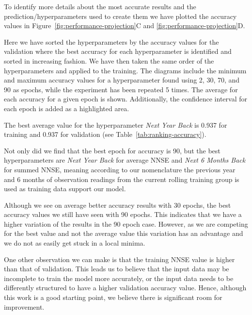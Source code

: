 \documentclass[utf8]{FrontiersinVancouver} %
\begin{document}
\begin{table}[htb]
\begin{center}
{\begin{tabular}{|l||r|r|l|r|r|l|}
        \hline
        \end{tabular}
        }
        \end{center}
        
        \end{table}



To identify more details about the most accurate results and the prediction/hyperparameters used to create them we have plotted the accuracy values in Figure~\ref{fig:performance-projection}C and \ref{fig:performance-projection}D. 

Here we have sorted the hyperparameters by the accuracy values for the validation where the best accuracy for each hyperparameter is identified and sorted in increasing fashion. We have then taken the same order of the hyperparameters and applied to the training.
The diagrams include the minimum and maximum accuracy values for a hyperparameter found using 2, 30, 70, and 90 as epochs, while the experiment has been repeated 5 times. The average for each accuracy for a given epoch is shown. Additionally, the confidence interval for each epoch is added as a highlighted area.

The best average value for the hyperparameter {\em Next Year Back} is 0.937 for training and 0.937 for validation (see Table~\ref{tab:ranking-accuracy}).

Not only did we find that the best epoch for accuracy is 90, but the best hyperparameters are {\em Next Year Back} for average NNSE and {\em Next 6 Months Back} for summed NNSE, meaning according to our nomenclature the previous year and 6 months of observation readings from the current rolling training group is used as training data support our model.

Although we see on average better accuracy results with 30 epochs, the best accuracy values we still have seen with 90 epochs. This indicates that we have a higher variation of the results in the 90 epoch case. However, as we are competing for the best value and not the average value this variation has an advantage and we do not as easily get stuck in a local minima. 

One other observation we can make is that the training NNSE value is higher than that of validation. This leads us to believe that the input data may be incomplete to train the model more accurately, or the input data needs to be differently structured to have a higher validation accuracy value. 
Hence, although this work is a good starting point, we believe there is significant room for improvement.
\end{document}
